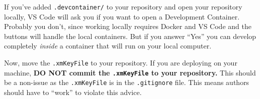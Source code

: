 \documentclass{ximera}
\begin{document}
\begin{warning}
    If you've added \verb!.devcontainer/! to your repository and open your repository
    locally, VS Code will ask you if you want to open a Development Container.
    Probably you don't, since working locally requires Docker and VS Code and the buttons will handle the local containers.
    But if you answer ``Yes'' you can develop completely \textit{inside} a container that will run on your local computer. 
\end{warning}

Now, move the \verb!.xmKeyFile! to your repository.
If you are deploying on your machine, \textbf{DO NOT commit the
    \texttt{.xmKeyFile} to your repository.} This should be a non-issue as the \verb!.xmKeyFile! is in the \verb!.gitignore! file.
    This means authors should have to ``work'' to violate this advice.
\end{document}
